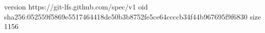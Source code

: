 version https://git-lfs.github.com/spec/v1
oid sha256:052559f5869e5517464418de50b3b8752fe5ce64ccccb34f44b967695f9f6830
size 1156
